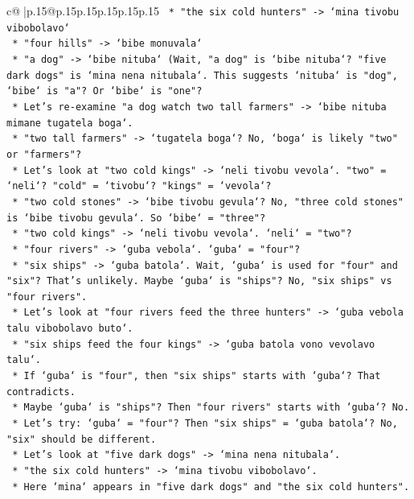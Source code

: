 \documentclass{article}
\begin{document}
{\begin{supertabular}{c@{$\;$}|p{.15\linewidth}@{}p{.15\linewidth}p{.15\linewidth}p{.15\linewidth}p{.15\linewidth}p{.15\linewidth}}
{{{\texttt{        *   "the six cold hunters" {-}> `mina tivobu vibobolavo`} \\
\texttt{        *   "four hills" {-}> `bibe monuvala`} \\
\texttt{        *   "a dog" {-}> `bibe nituba` (Wait, "a dog" is `bibe nituba`? "five dark dogs" is `mina nena nitubala`. This suggests `nituba` is "dog", `bibe` is "a"? Or `bibe` is "one"?} \\
\texttt{        *   Let's re{-}examine "a dog watch two tall farmers" {-}> `bibe nituba mimane tugatela boga`.} \\
\texttt{        *   "two tall farmers" {-}> `tugatela boga`? No, `boga` is likely "two" or "farmers"?} \\
\texttt{        *   Let's look at "two cold kings" {-}> `neli tivobu vevola`. "two" = `neli`? "cold" = `tivobu`? "kings" = `vevola`?} \\
\texttt{        *   "two cold stones" {-}> `bibe tivobu gevula`? No, "three cold stones" is `bibe tivobu gevula`. So `bibe` = "three"?} \\
\texttt{        *   "two cold kings" {-}> `neli tivobu vevola`. `neli` = "two"?} \\
\texttt{        *   "four rivers" {-}> `guba vebola`. `guba` = "four"?} \\
\texttt{        *   "six ships" {-}> `guba batola`. Wait, `guba` is used for "four" and "six"? That's unlikely. Maybe `guba` is "ships"? No, "six ships" vs "four rivers".} \\
\texttt{        *   Let's look at "four rivers feed the three hunters" {-}> `guba vebola talu vibobolavo buto`.} \\
\texttt{        *   "six ships feed the four kings" {-}> `guba batola vono vevolavo talu`.} \\
\texttt{        *   If `guba` is "four", then "six ships" starts with `guba`? That contradicts.} \\
\texttt{        *   Maybe `guba` is "ships"? Then "four rivers" starts with `guba`? No.} \\
\texttt{        *   Let's try: `guba` = "four"? Then "six ships" = `guba batola`? No, "six" should be different.} \\
\texttt{        *   Let's look at "five dark dogs" {-}> `mina nena nitubala`.} \\
\texttt{        *   "the six cold hunters" {-}> `mina tivobu vibobolavo`.} \\
\texttt{        *   Here `mina` appears in "five dark dogs" and "the six cold hunters".} \\
}}}
\end{supertabular}}
\end{document}
